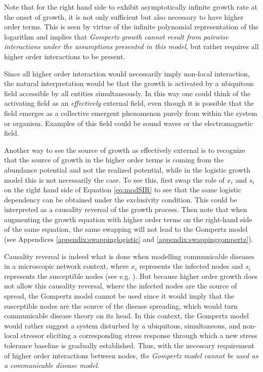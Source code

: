 \documentclass{article}
\begin{document}
Note that for the right hand side to exhibit asymptotically infinite growth rate at the onset of growth, it is not only sufficient but also necessary to have higher order terms. This is seen by virtue of the infinite polynomial representation of the logarithm and implies that \textit{Gompertz growth cannot result from pairwise interactions under the assumptions presented in this model}, but rather requires all higher order interactions to be present.

Since all higher order interaction would necessarily imply non-local interaction, the natural interpretation would be that the growth is activated by a ubiquitous field accessible by all entities simultaneously. 
In this way one could think of the activating field as an \textit{effectively} external field, even though it is possible that the field emerges as a collective emergent phenomenon purely from within the system or organism. Examples of this field could be sound waves or the electromagnetic field.

Another way to see the source of growth as effectively external is to recognize that the source of growth in the higher order terms is coming from the abundance potential and not the realized potential, while in the logistic growth model this is not necessarily the case. 
To see this, first swap the role of $x_i$ and $s_i$ on the right hand side of Equation \ref{eq:modSIR} to see that the same logistic dependency can be obtained under the exclusivity condition. This could be interpreted as a causality reversal of the growth process.
Then note that when augmenting the growth equation with higher order terms on the right-hand side of the same equation, the same swapping will not lead to the Gompertz model (see Appendices \ref{appendix:swappinglogistic} and \ref{appendix:swappinggompertz}). 

Causality reversal is indeed what is done when modelling communicable diseases in a microscopic network context, where $x_i$ represents the infected nodes and $s_i$ represents the susceptible nodes (see e.g. \citet{estrada2022networked}). But because higher order growth does not allow this causality reversal, where the infected nodes are the source of spread, the Gompertz model cannot be used since it would imply that the susceptible nodes are the source of the disease spreading, which would turn communicable disease theory on its head. In this context, the Gompertz model would rather suggest a system disturbed by a ubiquitous, simultaneous, and non-local stressor eliciting a corresponding stress response through which a new stress tolerance baseline is gradually established. Thus, with the necessary requirement of higher order interactions between nodes, \textit{the Gompertz model cannot be used as a communicable disease model}.
\end{document}
